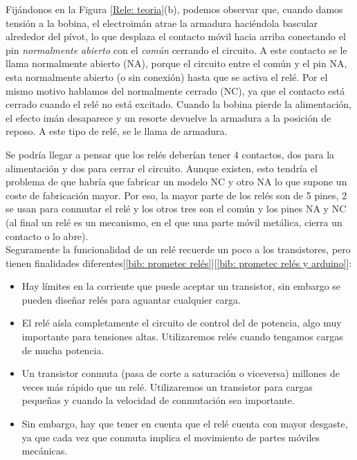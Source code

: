 \documentclass[12pt]{article}
\begin{document}
	\noindent Fijándonos en la Figura \ref{Rele: teoria}(b), podemos observar que, cuando damos tensión a la bobina, el electroimán atrae la armadura haciéndola bascular alrededor del pívot, lo que desplaza el contacto móvil hacia arriba conectando el pin \textit{normalmente abierto} con el \textit{común} cerrando el circuito. A este contacto se le llama normalmente abierto (NA), porque el circuito entre el común y el pin NA, esta normalmente abierto (o sin conexión) hasta que se activa el relé. Por el mismo motivo hablamos del normalmente cerrado (NC), ya que el contacto está cerrado cuando el relé no está excitado. Cuando la bobina pierde la alimentación, el efecto imán desaparece y un resorte devuelve la armadura a la posición de reposo. A este tipo de relé, se le llama de armadura.
	
	\noindent Se podría llegar a pensar que los relés deberían tener 4 contactos, dos para la alimentación y dos para cerrar el circuito. Aunque existen, esto tendría el problema de que habría que fabricar un modelo NC y otro NA lo que supone un coste de fabricación mayor. Por eso, la mayor parte de los relés son de 5 pines, 2 se usan para conmutar el relé y los otros tres son el común y los pines NA y NC (al final un relé es un mecanismo, en el que una parte móvil metálica, cierra un contacto o lo abre). \\
	
	\noindent Seguramente la funcionalidad de un relé recuerde un poco a los transistores, pero tienen finalidades diferentes[\ref{bib: prometec relés}][\ref{bib: prometec relés y arduino}]:
	
	\begin{itemize}
		\item Hay límites en la corriente que puede aceptar un transistor, sin embargo se pueden diseñar relés para aguantar cualquier carga.
		\item El relé aísla completamente el circuito de control del de potencia, algo muy importante para tensiones altas. Utilizaremos relés cuando tengamos cargas de mucha potencia.
		\item Un transistor conmuta (pasa de corte a saturación o viceversa) millones de veces más rápido que un relé.  Utilizaremos un transistor para cargas pequeñas y cuando la velocidad de conmutación sea importante.
		\item Sin embargo, hay que tener en cuenta que el relé cuenta con mayor desgaste, ya que cada vez que conmuta implica el movimiento de partes móviles mecánicas.
	\end{itemize}
	
\end{document}
